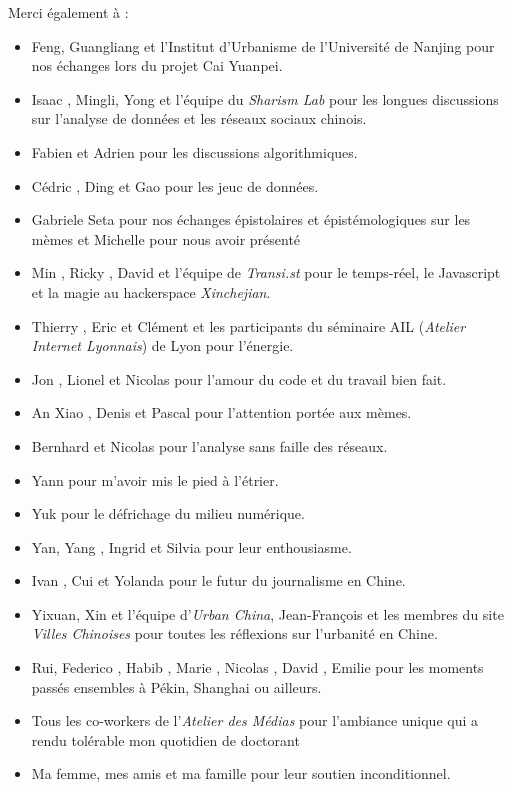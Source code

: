Merci également à : 
\begin{itemize}
    \item {} Feng, {} Guangliang et l'Institut d'Urbanisme de l'Université de Nanjing pour  nos échanges lors du projet Cai Yuanpei.
    \item Isaac {}, {} Mingli, {} Yong et l'équipe du \textit{Sharism Lab} pour les longues discussions sur l'analyse de données et les réseaux sociaux chinois.
    \item Fabien {} et Adrien {} pour les discussions algorithmiques.
    \item Cédric {}, {} Ding et {} Gao pour les jeuc de données.
    \item Gabriele {} Seta pour nos échanges épistolaires et épistémologiques sur les mèmes et Michelle {} pour nous avoir présenté
    \item  Min {}, Ricky {}, David {} et l'équipe de \textit{Transi.st} pour le temps-réel, le Javascript et la magie au hackerspace \textit{Xinchejian}.
    \item Thierry {}, Eric {} et Clément {} et les participants du séminaire AIL (\textit{Atelier Internet Lyonnais}) de Lyon pour l'énergie.
    \item Jon {}, Lionel {} et Nicolas {} pour l'amour du code et du travail bien fait.
    \item An Xiao {}, Denis {} et Pascal {} pour l'attention portée aux mèmes.
    \item Bernhard {} et Nicolas {} pour l'analyse sans faille des réseaux.
    \item Yann {} pour m'avoir mis le pied à l'étrier.
    \item Yuk {} pour le défrichage du milieu numérique.
    \item {} Yan, Yang {}, Ingrid {} et Silvia {} pour leur enthousiasme.
    \item Ivan {}, Cui {} et Yolanda {} pour le futur du journalisme en Chine.
    \item {} Yixuan, {} Xin et l'équipe d'\textit{Urban China}, Jean-François {} et les membres du site \textit{Villes Chinoises} pour toutes les réflexions sur l'urbanité en Chine.
    \item {} Rui, Federico {}, Habib {}, Marie {}, Nicolas {}, David {}, Emilie {} pour les moments passés ensembles à Pékin, Shanghai ou ailleurs.
    \item Tous les co-workers de l'\textit{Atelier des Médias} pour l'ambiance unique qui a rendu tolérable mon quotidien de doctorant
    \item Ma femme, mes amis et ma famille pour leur soutien inconditionnel.
\end{itemize}


